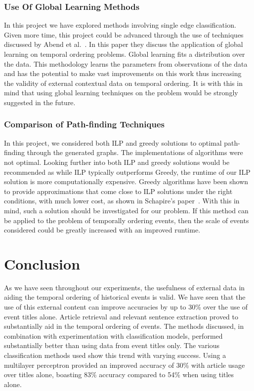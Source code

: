 \documentclass[bsc,frontabs,twoside,singlespacing,parskip,deptreport]{infthesis}     %
\begin{document}
\subsection{Use Of Global Learning Methods}
In this project we have explored methods involving single edge classification. Given more time,
this project could be advanced through the use of techniques discussed by Abend et al.~\cite{abend2015lexical}.
In this paper they discuss the application of global learning on temporal ordering problems. Global learning
fits a distribution over the data. This methodology learns the parameters from observations of the data~\cite{Huang2008}
and has the potential to make vast improvements on this work thus increasing the validity
of external contextual data on temporal ordering. It is with this in mind that using global learning techniques on the problem
would be strongly suggested in the future.

\subsection{Comparison of Path-finding Techniques}
In this project, we considered both ILP and greedy solutions to optimal path-finding through the generated graphs.
The implementations of algorithms were not optimal. Looking further into both ILP and greedy solutions would
be recommended as while ILP typically outperforms Greedy, the runtime of our ILP solution is more computationally
expensive. Greedy algorithms have been shown to provide approximations that come close to ILP solutions under the right
conditions, with much lower cost, as shown in Schapire's paper~\cite{schapire1998learning}. With this in mind,
such a solution should be investigated for our problem. If this method can
be applied to the problem of temporally ordering events, then the scale of events considered could be greatly increased with
an improved runtime.



\chapter{Conclusion}
As we have seen throughout our experiments, the usefulness of external data in aiding the temporal ordering
of historical events is valid. We have seen that the use of this external content can improve accuracies by up to
30\% over the use of event titles alone.
Article retrieval and relevant sentence extraction proved to substantially aid in the temporal ordering of events.
The methods discussed, in combination with experimentation with classification models, performed substantially better
than using data from event titles only.
The various classification methods used show this trend with varying success. Using a multilayer perceptron provided an
improved accuracy of 30\% with article usage over titles alone, boasting 83\% accuracy compared to 54\% when using titles
alone.
\end{document}
